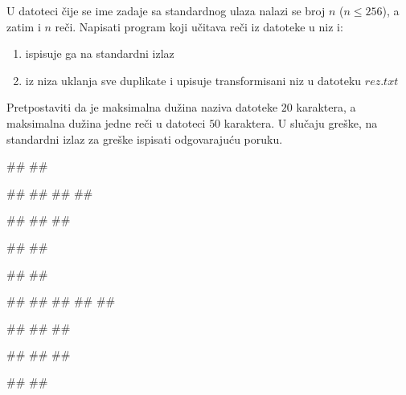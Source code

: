 \begin{Exercise}[label=p3_iv5]         
U datoteci čije se ime zadaje sa standardnog ulaza nalazi
se broj $n$ ($n\leq 256$), a zatim i $n$ reči. 
Napisati program koji učitava reči iz datoteke u niz i:
  \begin{enumerate}
  \item ispisuje ga na standardni izlaz 
  \item iz niza uklanja sve duplikate i upisuje transformisani niz u datoteku $rez.txt$ 
  \end{enumerate}
Pretpostaviti da je maksimalna dužina naziva datoteke $20$ karaktera, 
a maksimalna dužina jedne reči u datoteci $50$ karaktera.
U slučaju greške, na standardni izlaz za greške ispisati odgovarajuću poruku.

\begin{miditest}
\begin{upotreba}{1}
#\naslovInt#
##

##
##
##
##

#\naslovIzlaz#
##
##

##
##
\end{upotreba}
\end{miditest}
\begin{miditest}
\begin{upotreba}{2}
#\naslovInt#
##

##
##
##
##
##

#\naslovIzlaz#
##
##

##
##
##
\end{upotreba}
\end{miditest}

\begin{miditest}
\begin{upotreba}{3}
#\naslovInt#
##


\end{upotreba}
\end{miditest}
\end{Exercise}
